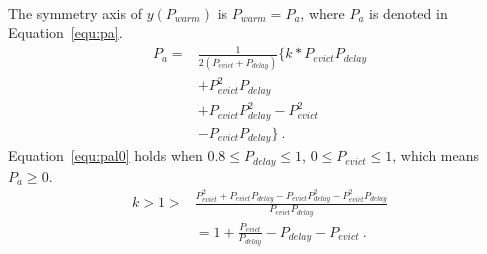  \ \par
The symmetry axis of $y(P_{warm})$ is $P_{warm} = P_{a}$, where $P_{a}$ is denoted in Equation~\ref{equ:pa}.
\begin{equation}
\label{equ:pa}
\begin{split}
P_{a} = &\frac{1}{2(P_{evict}+P_{delay})}\{k*P_{evict}P_{delay}\\
& + P_{evict}^{2}P_{delay} \\
&+ P_{evict}P_{delay}^{2} - P_{evict}^{2} \\
& - P_{evict}P_{delay}\} \ .
\end{split}
\end{equation}
Equation~\ref{equ:pal0} holds when $0.8 \leq P_{delay} \leq 1$, $0 \leq P_{evict} \leq 1$,  which means $P_{a}  \geq 0$.
  \begin{equation}
  \label{equ:pal0}
  \begin{split}
     k  > 1 > & \frac{P_{evict}^{2} + P_{evict}P_{delay} - P_{evict}P_{delay}^{2} - P_{evict}^{2}P_{delay}}{P_{evict}P_{delay}} \\
     &=1+ \frac{P_{evict}}{P_{delay}} - P_{delay} - P_{evict} \ .
  \end{split}
  \end{equation}



